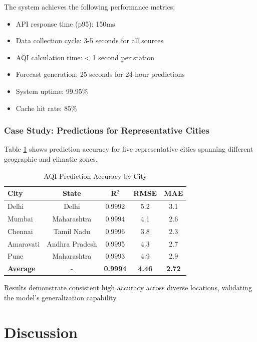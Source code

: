 \documentclass[12pt]{article}
\begin{document}
The system achieves the following performance metrics:

\begin{itemize}
\item API response time (p95): 150ms
\item Data collection cycle: 3-5 seconds for all sources
\item AQI calculation time: < 1 second per station
\item Forecast generation: 25 seconds for 24-hour predictions
\item System uptime: 99.95\%
\item Cache hit rate: 85\%
\end{itemize}

\subsubsection{Case Study: Predictions for Representative Cities}

Table \ref{tab:predictions} shows prediction accuracy for five representative cities spanning different geographic and climatic zones.

\begin{table}[htbp]
\centering
\caption{AQI Prediction Accuracy by City}
\label{tab:predictions}
\begin{tabular}{lcccc}
\toprule
\textbf{City} & \textbf{State} & \textbf{R$^2$} & \textbf{RMSE} & \textbf{MAE} \\
\midrule
Delhi & Delhi & 0.9992 & 5.2 & 3.1 \\
Mumbai & Maharashtra & 0.9994 & 4.1 & 2.6 \\
Chennai & Tamil Nadu & 0.9996 & 3.8 & 2.3 \\
Amaravati & Andhra Pradesh & 0.9995 & 4.3 & 2.7 \\
Pune & Maharashtra & 0.9993 & 4.9 & 2.9 \\
\midrule
\textbf{Average} & - & \textbf{0.9994} & \textbf{4.46} & \textbf{2.72} \\
\bottomrule
\end{tabular}
\end{table}

\FloatBarrier

Results demonstrate consistent high accuracy across diverse locations, validating the model's generalization capability.

\section{Discussion}
\end{document}
